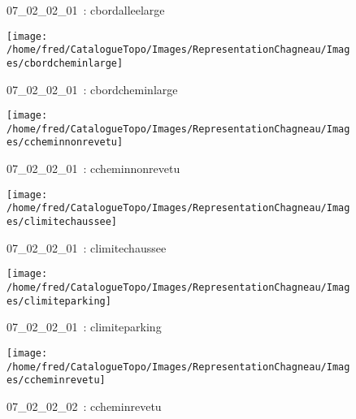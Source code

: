 \documentclass[12pt,titlepage]{book}
\begin{document}
\begin{figure}[h!]
\begin{minipage}[t]{3cm}
\begin{center}
      \caption[~07\_02\_02\_01]{\small{07\_02\_02\_01~:} \tiny{cbordalleelarge}}\label{cbordalleelarge}
    \end{center}
  \end{minipage}
  \begin{minipage}[t]{3cm}
    \begin{center}
      \texttt{[image: /home/fred/CatalogueTopo/Images/RepresentationChagneau/Images/cbordcheminlarge]}
      \caption[~07\_02\_02\_01]{\small{07\_02\_02\_01~:} \tiny{cbordcheminlarge}}\label{cbordcheminlarge}
    \end{center}
  \end{minipage}
  \begin{minipage}[t]{3cm}
    \begin{center}
      \texttt{[image: /home/fred/CatalogueTopo/Images/RepresentationChagneau/Images/ccheminnonrevetu]}
      \caption[~07\_02\_02\_01]{\small{07\_02\_02\_01~:} \tiny{ccheminnonrevetu}}\label{ccheminnonrevetu}
    \end{center}
  \end{minipage}
  \begin{minipage}[t]{3cm}
    \begin{center}
      \texttt{[image: /home/fred/CatalogueTopo/Images/RepresentationChagneau/Images/climitechaussee]}
      \caption[~07\_02\_02\_01]{\small{07\_02\_02\_01~:} \tiny{climitechaussee}}\label{climitechaussee}
    \end{center}
  \end{minipage}
  \begin{minipage}[t]{3cm}
    \begin{center}
      \texttt{[image: /home/fred/CatalogueTopo/Images/RepresentationChagneau/Images/climiteparking]}
      \caption[~07\_02\_02\_01]{\small{07\_02\_02\_01~:} \tiny{climiteparking}}\label{climiteparking}
    \end{center}
  \end{minipage}
  \begin{minipage}[t]{3cm}
    \begin{center}
      \texttt{[image: /home/fred/CatalogueTopo/Images/RepresentationChagneau/Images/ccheminrevetu]}
      \caption[~07\_02\_02\_02]{\small{07\_02\_02\_02~:} \tiny{ccheminrevetu}}\label{ccheminrevetu}

\end{center}
\end{minipage}
\end{figure}
\end{document}
